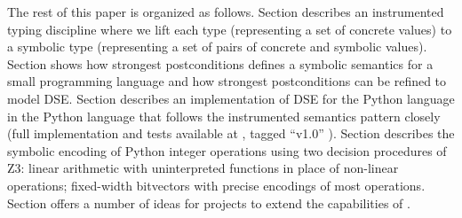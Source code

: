 \documentclass{IOS-Book-Article}
\begin{document}
\begin{mdP}[data-line={314}]%
{}The rest of this paper is organized as follows. Section%
{}{\mdNbsp}%
{} 
describes an instrumented typing discipline where we lift each type (representing 
a set of concrete values) to a symbolic type (representing
a set of pairs of concrete and symbolic values).
Section%
{}{\mdNbsp}%
{} shows how strongest postconditions defines a symbolic
semantics for a small programming language and how strongest postconditions
can be refined to model DSE.
Section%
{}{\mdNbsp}%
{} describes an implementation of DSE for the Python language
in the Python language that follows the instrumented semantics pattern closely
(full implementation and tests available at%
{}{\mdNbsp}%
{}, tagged %
{}{\textquotedblleft}v1.0{\textquotedblright}%
{}).
Section%
{}{\mdNbsp}%
{} describes the symbolic encoding of Python integer 
operations using two decision procedures of Z3: linear arithmetic with
uninterpreted functions in place of non-linear operations;
fixed-width bitvectors with precise encodings of most operations.
Section%
{}{\mdNbsp}%
{} offers a number of ideas for projects
to extend the capabilities of%
{}{\mdNbsp}%
{}.%
\end{mdP}%
\end{document}
